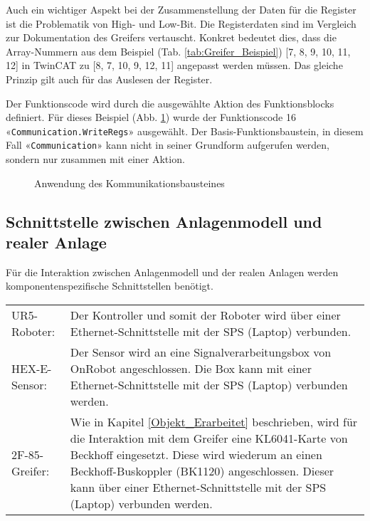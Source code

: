 		\begin{bfhNoteBox}
			Auch ein wichtiger Aspekt bei der Zusammenstellung der Daten für die Register ist die Problematik von High- und Low-Bit. Die Registerdaten sind im Vergleich zur Dokumentation des Greifers vertauscht. Konkret bedeutet dies, dass die Array-Nummern aus dem Beispiel (Tab. \ref{tab:Greifer_Beispiel}) [7, 8, 9, 10, 11, 12] in TwinCAT zu [8, 7, 10, 9, 12, 11] angepasst werden müssen. Das gleiche Prinzip gilt auch für das Auslesen der Register.
		\end{bfhNoteBox}
		\vspace{3mm} 
		Der Funktionscode wird durch die ausgewählte Aktion des Funktionsblocks definiert. Für dieses Beispiel (Abb. \ref{fig:FB_Anwenung_Kommunikation}) wurde der Funktionscode 16 «\verb|Communication.WriteRegs|» ausgewählt. Der Basis-Funktionsbaustein, in diesem Fall «\verb|Communication|» kann nicht in seiner Grundform aufgerufen werden, sondern nur zusammen mit einer Aktion. 
		
		\begin{figure}[H]
			\centering
			\captionsetup{justification=centering}
			\caption{Anwendung des Kommunikationsbausteines}
			\label{fig:FB_Anwenung_Kommunikation}
		\end{figure}
		
		\newpage
		
	\subsection{Schnittstelle zwischen Anlagenmodell und realer Anlage} \label{Schnittstelle_Anlagenmodell_Anlage}
		Für die Interaktion zwischen Anlagenmodell und der realen Anlagen werden komponentenspezifische Schnittstellen benötigt. 
		\vspace{2mm}
		
		\begin{tabularx}{\textwidth}{@{}>{}p{8em} X@{}}
		UR5-Roboter: & 
		Der Kontroller und somit der Roboter wird über einer Ethernet-Schnittstelle mit der SPS (Laptop) verbunden. 
		\\
		HEX-E-Sensor: & 
		Der Sensor wird an eine Signalverarbeitungsbox von OnRobot angeschlossen. Die Box kann mit einer Ethernet-Schnittstelle mit der SPS (Laptop) verbunden werden.  
		\\
		2F-85-Greifer: & 
		Wie in Kapitel \ref{Objekt_Erarbeitet} beschrieben, wird für die Interaktion mit dem Greifer eine KL6041-Karte von Beckhoff eingesetzt. Diese wird wiederum an einen Beckhoff-Buskoppler (BK1120) angeschlossen. Dieser kann über einer Ethernet-Schnittstelle mit der SPS (Laptop) verbunden werden.  
		\\
		\end{tabularx}
		\vspace{2mm}
		
